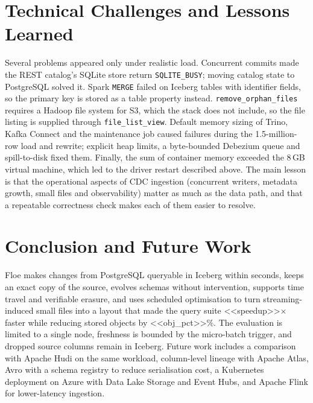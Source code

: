 \documentclass[conference,a4paper]{IEEEtran}
\newcommand{\code}[1]{\texttt{#1}}
\begin{document}
\section{Technical Challenges and Lessons Learned}
Several problems appeared only under realistic load. Concurrent commits made the REST catalog's SQLite store return
\code{SQLITE\_BUSY}; moving catalog state to PostgreSQL solved it. Spark \code{MERGE} failed on Iceberg tables with
identifier fields, so the primary key is stored as a table property instead. \code{remove\_orphan\_files} requires a
Hadoop file system for S3, which the stack does not include, so the file listing is supplied through
\code{file\_list\_view}. Default memory sizing of Trino, Kafka Connect and the maintenance job caused failures during
the 1.5-million-row load and rewrite; explicit heap limits, a byte-bounded Debezium queue and spill-to-disk fixed them.
Finally, the sum of container memory exceeded the 8\,GB virtual machine, which led to the driver restart described
above. The main lesson is that the operational aspects of CDC ingestion (concurrent writers, metadata growth, small
files and observability) matter as much as the data path, and that a repeatable correctness check makes each of them
easier to resolve.

\section{Conclusion and Future Work}
Floe makes changes from PostgreSQL queryable in Iceberg within seconds, keeps an exact copy of the source, evolves
schemas without intervention, supports time travel and verifiable erasure, and uses scheduled optimisation to turn
streaming-induced small files into a layout that made the query suite <<speedup>>$\times$ faster while reducing stored
objects by <<obj_pct>>\%. The evaluation is limited to a single node, freshness is bounded by the micro-batch trigger,
and dropped source columns remain in Iceberg. Future work includes a comparison with Apache Hudi on the same
workload, column-level lineage with Apache Atlas, Avro with a schema registry to reduce serialisation cost, a
Kubernetes deployment on Azure with Data Lake Storage and Event Hubs, and Apache Flink for lower-latency ingestion.
\end{document}
